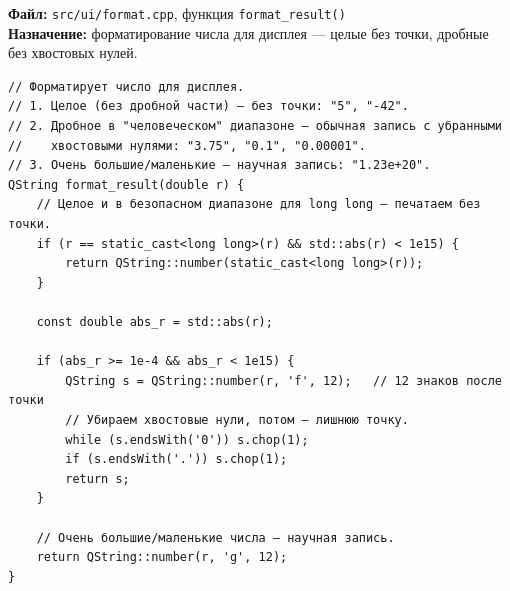 



\noindent\textbf{Файл:} \texttt{src/ui/format.cpp}, функция \texttt{format\_result()}\\
\textbf{Назначение:} форматирование числа для дисплея --- целые без точки, дробные без хвостовых нулей.

\begin{lstlisting}
// Форматирует число для дисплея.
// 1. Целое (без дробной части) — без точки: "5", "-42".
// 2. Дробное в "человеческом" диапазоне — обычная запись с убранными
//    хвостовыми нулями: "3.75", "0.1", "0.00001".
// 3. Очень большие/маленькие — научная запись: "1.23e+20".
QString format_result(double r) {
    // Целое и в безопасном диапазоне для long long — печатаем без точки.
    if (r == static_cast<long long>(r) && std::abs(r) < 1e15) {
        return QString::number(static_cast<long long>(r));
    }

    const double abs_r = std::abs(r);

    if (abs_r >= 1e-4 && abs_r < 1e15) {
        QString s = QString::number(r, 'f', 12);   // 12 знаков после точки
        // Убираем хвостовые нули, потом — лишнюю точку.
        while (s.endsWith('0')) s.chop(1);
        if (s.endsWith('.')) s.chop(1);
        return s;
    }

    // Очень большие/маленькие числа — научная запись.
    return QString::number(r, 'g', 12);
}
\end{lstlisting}


